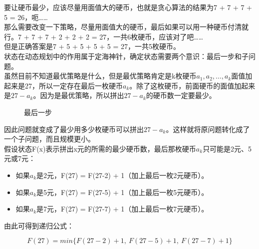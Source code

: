 要让硬币最少，应该尽量用面值大的硬币，也就是贪心算法的结果为7 + 7 + 7 + 5 = 26，呃…… \\

那么需要改变一下策略，尽量用面值大的硬币，最后如果可以用一种硬币付清就行。7 + 7 + 7 + 2 + 2 + 2 = 27，一共6枚硬币，应该对了吧…… \\

但是正确答案是7 + 5 + 5 + 5 + 5 = 27，一共5枚硬币。 \\

状态在动态规划中的作用属于定海神针，确定状态需要两个意识：最后一步和子问题。 \\

虽然目前不知道最优策略是什么，但是最优策略肯定是k枚硬币$ a_1, a_2, \dots, a_k $面值加起来是27，所以一定存在最后一枚硬币$ a_k $。除了这枚硬币，前面硬币的面值加起来是$ 27 - a_k $。因为是最优策略，所以拼出$ 27 - a_k $的硬币数一定要最少。 \\

\begin{figure}[H]
	\centering
	\caption{最后一步}
\end{figure}

因此问题就变成了最少用多少枚硬币可以拼出$ 27 - a_k $。这样就将原问题转化成了一个子问题，而且规模更小。 \\

假设状态F(x)表示拼出x元的所需的最少硬币数，最后那枚硬币$ a_k $只可能是2元、5元或7元：

\begin{itemize}
	\item 如果$ a_k $是2元，F(27) = F(27-2) + 1（加上最后一枚2元硬币）。

	\item 如果$ a_k $是5元，F(27) = F(27-5) + 1（加上最后一枚5元硬币）。

	\item 如果$ a_k $是7元，F(27) = F(27-7) + 1（加上最后一枚7元硬币）。
\end{itemize}

由此可得到递归公式：

\vspace{-0.5cm}

$$
	F(27) = min\{F(27-2)+1,\ F(27-5)+1,\ F(27-7)+1\}
$$

